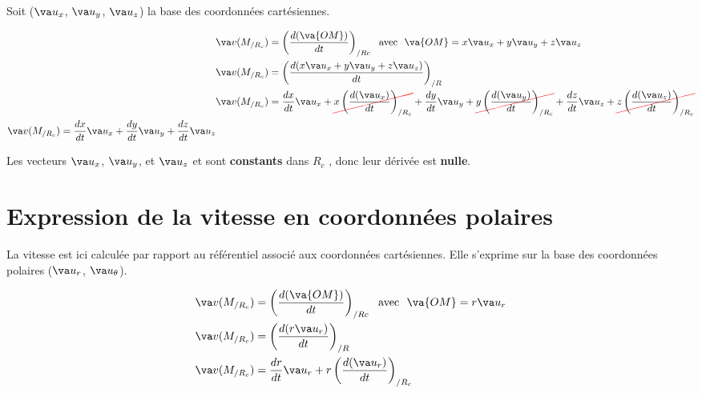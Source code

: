 \documentclass[
  12pt,
  openany]{book}
\theoremstyle{plain}
\theoremstyle{remark}
\begin{document}
Soit (\(\va u_x\), \(\va u_y\), \(\va u_z\)) la base des coordonnées
cartésiennes.

\begin{align*}
    &\va v(M_{/R_c})=\left(\frac{d(\va{OM})}{dt}\right)_{/Rc} \ \ \text{avec} \ \ \va{OM} = x \va u_x + y \va u_y + z \va u_z\\
    &\va v(M_{/R_c})=\left(\frac{d(x \va u_x + y \va u_y + z \va u_z)}{dt}\right)_{/R}\\
    &\va v(M_{/R_c})=\frac{dx}{dt}\va u_x + 
    \let\OldcancelColor\CancelColor
    \renewcommand\CancelColor{\color{red}}
    \cancel{x\left(\frac{d(\va u_x)}{dt}\right)_{/R_c}}
    \renewcommand\CancelColor{\OldcancelColor}
 + \frac{dy}{dt}\va u_y + 
    \let\OldcancelColor\CancelColor
    \renewcommand\CancelColor{\color{red}}
    \cancel{y\left(\frac{d(\va u_y)}{dt}\right)_{/R_c}}
    \renewcommand\CancelColor{\OldcancelColor}
 + \frac{dz}{dt}\va u_z +  
    \let\OldcancelColor\CancelColor
    \renewcommand\CancelColor{\color{red}}
    \cancel{z\left(\frac{d(\va u_z)}{dt}\right)_{/R_c}}
    \renewcommand\CancelColor{\OldcancelColor}
\\


    \va v(M_{/R_c})=\dfrac{dx}{dt}\va u_x + \dfrac{dy}{dt}\va u_y + \dfrac{dz}{dt}\va u_z \\
\end{align*}

Les vecteurs \(\va u_x\), \(\va u_y\), et \(\va u_z\) et sont
\textbf{constants} dans \(R_c\) , donc leur dérivée est \textbf{nulle}.

\section{Expression de la vitesse en coordonnées
polaires}\label{expression-de-la-vitesse-en-coordonnuxe9es-polaires}

La vitesse est ici calculée par rapport au référentiel associé aux
coordonnées cartésiennes. Elle s'exprime sur la base des coordonnées
polaires (\(\va u_r\), \(\va u_\theta\)).

\begin{align*}
    &\va v(M_{/R_c})=\left(\frac{d(\va{OM})}{dt}\right)_{/Rc} \ \ \text{avec} \ \ \va{OM} = r \va u_r\\
    &\va v(M_{/R_c})=\left(\frac{d(r \va u_r)}{dt}\right)_{/R}\\
    &\va v(M_{/R_c})=\frac{dr}{dt}\va u_r + r\left(\frac{d(\va u_r)}{dt}\right)_{/R_c} 
\end{align*}
\end{document}
